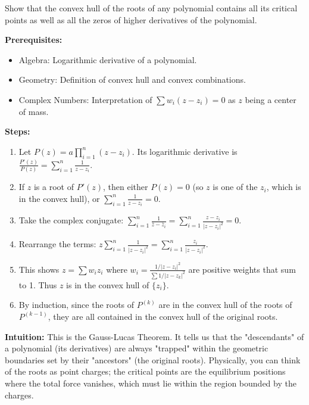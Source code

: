 \begin{exercise}
\label{analysis:2013:9}
Show that the convex hull of the roots of any polynomial contains all its critical points as well as all the zeros of higher derivatives of the polynomial.
\end{exercise}

\begin{solution}
\textbf{Prerequisites:}
\begin{itemize}
    \item Algebra: Logarithmic derivative of a polynomial.
    \item Geometry: Definition of convex hull and convex combinations.
    \item Complex Numbers: Interpretation of $\sum w_i (z - z_i) = 0$ as $z$ being a center of mass.
\end{itemize}

\textbf{Steps:}
\begin{enumerate}
    \item Let $P(z) = a \prod_{i=1}^n (z - z_i)$. Its logarithmic derivative is $\frac{P'(z)}{P(z)} = \sum_{i=1}^n \frac{1}{z - z_i}$.

    \item If $z$ is a root of $P'(z)$, then either $P(z) = 0$ (so $z$ is one of the $z_i$, which is in the convex hull), or $\sum_{i=1}^n \frac{1}{z - z_i} = 0$.

    \item Take the complex conjugate: $\sum_{i=1}^n \frac{1}{\bar{z} - \bar{z}_i} = \sum_{i=1}^n \frac{z - z_i}{|z - z_i|^2} = 0$.

    \item Rearrange the terms: $z \sum_{i=1}^n \frac{1}{|z - z_i|^2} = \sum_{i=1}^n \frac{z_i}{|z - z_i|^2}$.

    \item This shows $z = \sum w_i z_i$ where $w_i = \frac{1/|z-z_i|^2}{\sum 1/|z-z_k|^2}$ are positive weights that sum to 1. Thus $z$ is in the convex hull of $\{z_i\}$.

    \item By induction, since the roots of $P^{(k)}$ are in the convex hull of the roots of $P^{(k-1)}$, they are all contained in the convex hull of the original roots.
\end{enumerate}

\textbf{Intuition:}
This is the Gauss-Lucas Theorem. It tells us that the "descendants" of a polynomial (its derivatives) are always "trapped" within the geometric boundaries set by their "ancestors" (the original roots). Physically, you can think of the roots as point charges; the critical points are the equilibrium positions where the total force vanishes, which must lie within the region bounded by the charges.
\end{solution}

